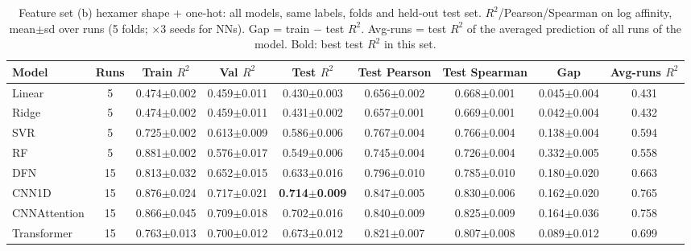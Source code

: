 \begin{table}[H]\centering\scriptsize\setlength{\tabcolsep}{3pt}
\caption{Feature set (b) hexamer shape + one-hot: all models, same labels, folds and held-out test set. $R^2$/Pearson/Spearman on log affinity, mean$\pm$sd over runs (5 folds; $\times$3 seeds for NNs). Gap = train $-$ test $R^2$. Avg-runs = test $R^2$ of the averaged prediction of all runs of the model. Bold: best test $R^2$ in this set.}
\begin{tabular}{lcccccccc}\toprule
Model & Runs & Train $R^2$ & Val $R^2$ & Test $R^2$ & Test Pearson & Test Spearman & Gap & Avg-runs $R^2$\\\midrule
Linear & 5 & 0.474$\pm$0.002 & 0.459$\pm$0.011 & 0.430$\pm$0.003 & 0.656$\pm$0.002 & 0.668$\pm$0.001 & 0.045$\pm$0.004 & 0.431 \\
Ridge & 5 & 0.474$\pm$0.002 & 0.459$\pm$0.011 & 0.431$\pm$0.002 & 0.657$\pm$0.001 & 0.669$\pm$0.001 & 0.042$\pm$0.004 & 0.432 \\
SVR & 5 & 0.725$\pm$0.002 & 0.613$\pm$0.009 & 0.586$\pm$0.006 & 0.767$\pm$0.004 & 0.766$\pm$0.004 & 0.138$\pm$0.004 & 0.594 \\
RF & 5 & 0.881$\pm$0.002 & 0.576$\pm$0.017 & 0.549$\pm$0.006 & 0.745$\pm$0.004 & 0.726$\pm$0.004 & 0.332$\pm$0.005 & 0.558 \\
DFN & 15 & 0.813$\pm$0.032 & 0.652$\pm$0.015 & 0.633$\pm$0.016 & 0.796$\pm$0.010 & 0.785$\pm$0.010 & 0.180$\pm$0.020 & 0.663 \\
CNN1D & 15 & 0.876$\pm$0.024 & 0.717$\pm$0.021 & \textbf{0.714$\pm$0.009} & 0.847$\pm$0.005 & 0.830$\pm$0.006 & 0.162$\pm$0.020 & 0.765 \\
CNNAttention & 15 & 0.866$\pm$0.045 & 0.709$\pm$0.018 & 0.702$\pm$0.016 & 0.840$\pm$0.009 & 0.825$\pm$0.009 & 0.164$\pm$0.036 & 0.758 \\
Transformer & 15 & 0.763$\pm$0.013 & 0.700$\pm$0.012 & 0.673$\pm$0.012 & 0.821$\pm$0.007 & 0.807$\pm$0.008 & 0.089$\pm$0.012 & 0.699 \\
\bottomrule\end{tabular}\label{tab:fs_hexamer}\end{table}

